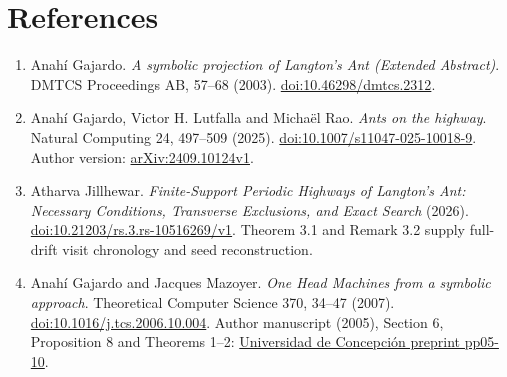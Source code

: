 \documentclass[
  11pt,
]{article}
\providecommand{\tightlist}{%
  \setlength{\itemsep}{0pt}\setlength{\parskip}{0pt}}
\begin{document}


\section{References}\label{references}

\begingroup\small
\begin{enumerate}
\def\labelenumi{\arabic{enumi}.}
\tightlist
\item
  Anahí Gajardo. \emph{A symbolic projection of Langton's Ant (Extended
  Abstract)}. DMTCS Proceedings AB, 57--68 (2003).
  \href{https://doi.org/10.46298/dmtcs.2312}{doi:10.46298/dmtcs.2312}.
\item
  Anahí Gajardo, Victor H. Lutfalla and Michaël Rao. \emph{Ants on the
  highway}. Natural Computing 24, 497--509 (2025).
  \href{https://doi.org/10.1007/s11047-025-10018-9}{doi:10.1007/s11047-025-10018-9}.
  Author version: \href{https://arxiv.org/abs/2409.10124v1}{arXiv:2409.10124v1}.
\item
  Atharva Jillhewar. \emph{Finite-Support Periodic Highways of Langton's
  Ant: Necessary Conditions, Transverse Exclusions, and Exact Search}
  (2026).
  \href{https://doi.org/10.21203/rs.3.rs-10516269/v1}{doi:10.21203/rs.3.rs-10516269/v1}.
  Theorem 3.1 and Remark 3.2 supply full-drift visit chronology and seed
  reconstruction.
\item
  Anahí Gajardo and Jacques Mazoyer. \emph{One Head Machines from a
  symbolic approach}. Theoretical Computer Science 370, 34--47 (2007).
  \newline\href{https://doi.org/10.1016/j.tcs.2006.10.004}{doi:10.1016/j.tcs.2006.10.004}.
  Author manuscript (2005), Section 6, Proposition 8 and Theorems 1--2:
  \href{https://www.ing-mat.udec.cl/investigacion/paginas-pp/download.php?file=pp05-10.pdf}{Universidad de Concepción preprint pp05-10}.
\end{enumerate}
\endgroup
\end{document}
